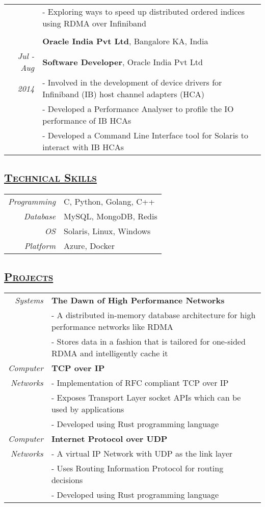 \documentclass[14pt]{article}
\begin{document}
\begin{tabularx}{\textwidth}{r X}
                                        & - Exploring ways to speed up distributed ordered indices using RDMA over Infiniband \\
\\
					& \large\textbf{Oracle India Pvt Ltd}, Bangalore KA, India \\
\emph{Jul - Aug} & \textbf{Software Developer}, Oracle India Pvt Ltd \\
\emph{2014  \enskip 2016}               & - Involved in the development of device drivers for Infiniband (IB) host channel adapters (HCA)\\
			                & - Developed a Performance Analyser to profile the IO performance of IB HCAs\\
			                & - Developed a Command Line Interface tool for Solaris to interact with IB HCAs
\end{tabularx}


\subsection* {\scshape\Large\uline {Technical Skills}}
\begin{tabular}{r l}
\emph{Programming} & C, Python, Golang, C++ \\
\emph{Database}	  & MySQL, MongoDB, Redis \\
\emph{OS} & Solaris, Linux, Windows \\
\emph{Platform} & Azure, Docker \\
\end{tabular}

\subsection* {\scshape\Large\uline {Projects}}
\begin{tabularx}{\textwidth}{r X}
\emph{Systems}  & \textbf{The Dawn of High Performance Networks} \\
	        & - A distributed in-memory database architecture for high performance networks like RDMA \\
		& - Stores data in a fashion that is tailored for one-sided RDMA and intelligently cache it\\
\emph{Computer} & \textbf{TCP over IP} \\
\emph{Networks} &  - Implementation of RFC compliant TCP over IP\\
                             & - Exposes Transport Layer socket APIs which can be used by applications\\
                             & - Developed using Rust programming language \\
\emph{Computer} & \textbf{Internet Protocol over UDP} \\
\emph{Networks} & - A virtual IP Network with UDP as the link layer\\
                             & - Uses Routing Information Protocol for routing decisions\\
                             & - Developed using Rust programming language\\
\end{tabularx}
\end{document}
